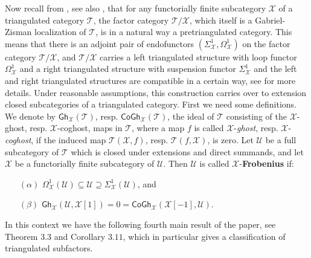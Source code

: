 \documentclass[oneside, a4paper,reqno]{amsart}
\numberwithin{equation}{section}
\theoremstyle{definition}
\begin{document}
Now recall from \cite{BR, B:3cats}, see also \cite{PJ}, that for any functorially finite subcategory ${\mathcal X}$ of a triangulated category ${\mathcal T}$, the factor category ${\mathcal T}/{\mathcal X}$, which itself is a Gabriel-Zisman localization of ${\mathcal T}$, is in a natural way a pretriangulated category. This means that there is an adjoint pair of endofunctors $(\Sigma^{1}_{\mathcal X},\Omega^{1}_{\mathcal X})$ on the factor category ${\mathcal T}/{\mathcal X}$, and ${\mathcal T}/{\mathcal X}$ carries a left triangulated structure with loop functor $\Omega^{1}_{\mathcal X}$ and a right triangulated structure with suspension functor $\Sigma^{1}_{\mathcal X}$ and the left and right triangulated structures are compatible in a certain way, see \cite{BR} for more details. Under reasonable assumptions, this construction carries over to extension closed subcategories of a triangulated category. First we need some definitions. We denote by  $\mathsf{Gh}_{\mathcal X}({\mathcal T})$, resp. $\mathsf{CoGh}_{\mathcal X}({\mathcal T})$, the ideal of ${\mathcal T}$ consisting of the ${\mathcal X}$-ghost, resp. ${\mathcal X}$-coghost, maps in ${\mathcal T}$, where a map $f$ is called ${\mathcal X}$-{\em ghost}, resp. ${\mathcal X}$-{\em coghost}, if the induced map ${\mathcal T}({\mathcal X},f)$, resp. ${\mathcal T}(f,{\mathcal X})$, is zero. Let ${\mathcal U}$ be a full subcategory of ${\mathcal T}$ which is closed under extensions and direct summands, and let ${\mathcal X}$ be a functorially finite subcategory of ${\mathcal U}$. Then ${\mathcal U}$ is called ${\mathcal X}$-{\bf Frobenius} if: 
\begin{enumerate}
\item[$(\alpha)$] $\Omega^{1}_{\mathcal X}({\mathcal U}) \subseteq {\mathcal U} \supseteq\Sigma^{1}_{\mathcal X}({\mathcal U})$, and
\item[$(\beta)$] $\mathsf{Gh}_{\mathcal X}({\mathcal U},{\mathcal X}[1]) = 0 = \mathsf{CoGh}_{\mathcal X}({\mathcal X}[-1],{\mathcal U})$. 
\end{enumerate}
In this context we have the following fourth main result of the paper, see Theorem $3.3$ and Corollary $3.11$,  which in particular gives a  classification of triangulated subfactors. 

\medskip
 
\end{document}
